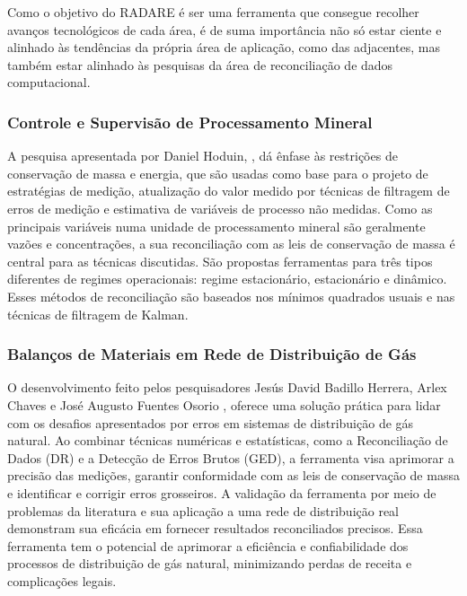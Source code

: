 Como o objetivo do RADARE é ser uma ferramenta que consegue recolher avanços tecnológicos de cada área, é de suma importância não só estar ciente e alinhado às tendências da própria área de aplicação, como das adjacentes, mas também estar alinhado às pesquisas da área de reconciliação de dados computacional. 

\subsubsection{Controle e Supervisão de Processamento Mineral}

A pesquisa apresentada por Daniel Hoduin, \cite{danielhoduin}, dá  ênfase às restrições de conservação de massa e energia, que são usadas como base para o projeto de estratégias de medição, atualização do valor medido por técnicas de filtragem de erros de medição e estimativa de variáveis de processo não medidas. Como as principais variáveis numa unidade de processamento mineral são geralmente vazões e concentrações, a sua reconciliação com as leis de conservação de massa é central para as técnicas discutidas. São propostas ferramentas para três tipos diferentes de regimes operacionais: regime estacionário, estacionário e dinâmico. Esses métodos de reconciliação são baseados nos mínimos quadrados usuais e nas técnicas de filtragem de Kalman.

\subsubsection{Balanços de Materiais em Rede de Distribuição de Gás}

O desenvolvimento feito pelos pesquisadores Jesús David Badillo Herrera, Arlex Chaves e José Augusto Fuentes Osorio \cite{balancecontrol}, oferece uma solução prática para lidar com os desafios apresentados por erros em sistemas de distribuição de gás natural. Ao combinar técnicas numéricas e estatísticas, como a Reconciliação de Dados (DR) e a Detecção de Erros Brutos (GED), a ferramenta visa aprimorar a precisão das medições, garantir conformidade com as leis de conservação de massa e identificar e corrigir erros grosseiros. A validação da ferramenta por meio de problemas da literatura e sua aplicação a uma rede de distribuição real demonstram sua eficácia em fornecer resultados reconciliados precisos. Essa ferramenta tem o potencial de aprimorar a eficiência e confiabilidade dos processos de distribuição de gás natural, minimizando perdas de receita e complicações legais.

